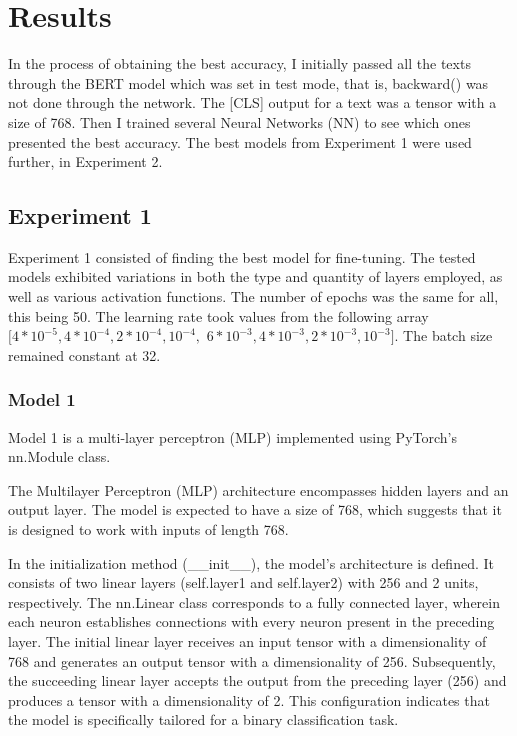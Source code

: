 \section{Results}

In the process of obtaining the best accuracy, I initially passed all the texts through the BERT model which was set in test mode, that is, backward() was not done through the network. The [CLS] output for a text was a tensor with a size of 768. Then I trained several Neural Networks (NN) to see which ones presented the best accuracy. The best models from Experiment 1 were used further, in Experiment 2.

\subsection{Experiment 1}

Experiment 1 consisted of finding the best model for fine-tuning. The tested models exhibited variations in both the type and quantity of layers employed, as well as various activation functions. The number of epochs was the same for all, this being 50. The learning rate took values from the following array 
$[4*10^{-5}, 4*10^{-4}, 2*10^{-4}, 10^{-4},$ \newline $6*10^{-3}, 4*10^{-3}, 2*10^{-3}, 10^{-3}]$. The batch size remained constant at 32.

\subsubsection{Model 1}


Model 1 is a multi-layer perceptron (MLP) implemented using PyTorch's nn.Module class.

The Multilayer Perceptron (MLP) architecture encompasses hidden layers and an output layer. The model is expected to have a size of 768, which suggests that it is designed to work with inputs of length 768.

In the initialization method (\_\_init\_\_), the model's architecture is defined. It consists of two linear layers (self.layer1 and self.layer2) with 256 and 2 units, respectively. The nn.Linear class corresponds to a fully connected layer, wherein each neuron establishes connections with every neuron present in the preceding layer. The initial linear layer receives an input tensor with a dimensionality of 768 and generates an output tensor with a dimensionality of 256. Subsequently, the succeeding linear layer accepts the output from the preceding layer (256) and produces a tensor with a dimensionality of 2. This configuration indicates that the model is specifically tailored for a binary classification task.

